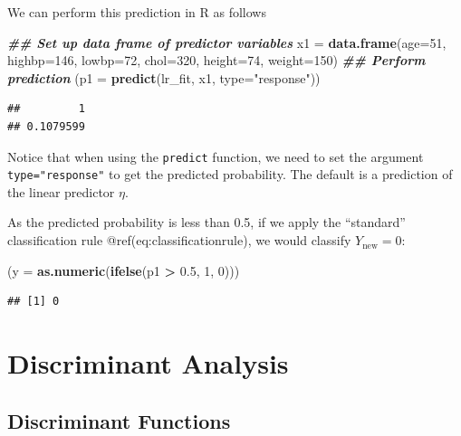 \documentclass[
]{article}
\newenvironment{Shaded}{\begin{snugshade}}{\end{snugshade}}
\newcommand{\AttributeTok}[1]{\textcolor[rgb]{0.13,0.29,0.53}{#1}}
\newcommand{\DecValTok}[1]{\textcolor[rgb]{0.00,0.00,0.81}{#1}}
\newcommand{\DocumentationTok}[1]{\textcolor[rgb]{0.56,0.35,0.01}{\textbf{\textit{#1}}}}
\newcommand{\FloatTok}[1]{\textcolor[rgb]{0.00,0.00,0.81}{#1}}
\newcommand{\FunctionTok}[1]{\textcolor[rgb]{0.13,0.29,0.53}{\textbf{#1}}}
\newcommand{\NormalTok}[1]{#1}
\newcommand{\OtherTok}[1]{\textcolor[rgb]{0.56,0.35,0.01}{#1}}
\newcommand{\SpecialCharTok}[1]{\textcolor[rgb]{0.81,0.36,0.00}{\textbf{#1}}}
\newcommand{\StringTok}[1]{\textcolor[rgb]{0.31,0.60,0.02}{#1}}
\begin{document}
We can perform this prediction in R as follows

\begin{Shaded}
\begin{Highlighting}[]
\DocumentationTok{\#\# Set up data frame of predictor variables}
\NormalTok{x1 }\OtherTok{=} \FunctionTok{data.frame}\NormalTok{(}\AttributeTok{age=}\DecValTok{51}\NormalTok{, }\AttributeTok{highbp=}\DecValTok{146}\NormalTok{, }\AttributeTok{lowbp=}\DecValTok{72}\NormalTok{, }\AttributeTok{chol=}\DecValTok{320}\NormalTok{, }\AttributeTok{height=}\DecValTok{74}\NormalTok{, }\AttributeTok{weight=}\DecValTok{150}\NormalTok{)}
\DocumentationTok{\#\# Perform prediction}
\NormalTok{(}\AttributeTok{p1 =} \FunctionTok{predict}\NormalTok{(lr\_fit, x1, }\AttributeTok{type=}\StringTok{"response"}\NormalTok{))}
\end{Highlighting}
\end{Shaded}

\begin{verbatim}
##         1 
## 0.1079599
\end{verbatim}

Notice that when using the \texttt{predict} function, we need to set the
argument \texttt{type="response"} to get the predicted probability. The
default is a prediction of the linear predictor \(\eta\).

As the predicted probability is less than 0.5, if we apply the
``standard'' classification rule @ref(eq:classificationrule), we would
classify \(Y_{\text{new}} = 0\):

\begin{Shaded}
\begin{Highlighting}[]
\NormalTok{(}\AttributeTok{y =} \FunctionTok{as.numeric}\NormalTok{(}\FunctionTok{ifelse}\NormalTok{(p1 }\SpecialCharTok{\textgreater{}} \FloatTok{0.5}\NormalTok{, }\DecValTok{1}\NormalTok{, }\DecValTok{0}\NormalTok{)))}
\end{Highlighting}
\end{Shaded}

\begin{verbatim}
## [1] 0
\end{verbatim}

\hypertarget{sec:discranal}{%
\section{Discriminant Analysis}\label{sec:discranal}}

\hypertarget{discriminant-functions}{%
\subsection{Discriminant Functions}\label{discriminant-functions}}
\end{document}
